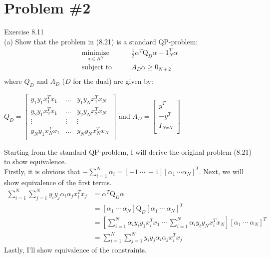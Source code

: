 \documentclass[12pt]{article}
\begin{document}
	\section*{Problem \#2}
	Exercise 8.11 \\
	(a) Show that the problem in (8.21) is a standard QP-problem:
	\begin{align*}
	\underset{\alpha \in R^{N}}{\text{minimize}} &\qquad \frac{1}{2}\alpha^T\text{Q}_D\alpha-1_{N}^{T}\alpha \\
	\text{subject to} & \qquad A_D\alpha \ge 0_{N+2} \\
	\end{align*}
	where $Q_D$ and $A_D$ ($D$ for the dual) are given by:\\
	\begin{center}
		$Q_D = \left[
		\begin{array}{ccc}
		y_1y_1x_1^Tx_1&\dots&y_1y_Nx_1^Tx_N \\
		y_2y_1x_2^Tx_1&\dots&y_2y_Nx_2^Tx_N \\
		\vdots & \vdots & \vdots \\
		y_Ny_1x_N^Tx_1&\dots&y_Ny_Nx_N^Tx_N \\
		\end{array}
		\right]$ and $A_D = \left[ 
		\begin{array}{c}
		y^T\\
		-y^T\\
		I_{N x N}\\
		\end{array} \right]$
	\end{center}
	Starting from the standard QP-problem, I will derive the original problem (8.21) to show equivalence. \\
	Firstly, it is obvious that $-\sum_{i=1}^{N}\alpha_i = [-1\ \cdots\ -1][\alpha_1 \ \cdots \alpha_N]^T$. Next, we will show equivalence of the first terms.
	\begin{align*}
		\sum_{i=1}^{N}\sum_{j=1}^{N}y_i y_j \alpha_i \alpha_j x_i^T x_j &= \alpha^T \text{Q}_D \alpha \\
		&= [\alpha_1 \ \cdots \ \alpha_N] \text{Q}_D [\alpha_1 \ \cdots \ \alpha_N]^T \\
		&= [\sum_{i=1}^{N}\alpha_iy_iy_1x_i^Tx_1 \ \cdots \ \sum_{i=1}^{N}\alpha_iy_iy_Nx_i^Tx_N] [\alpha_1 \ \cdots \ \alpha_N]^T \\
		&= \sum_{i=1}^{N}\sum_{j=1}^{N}y_i y_j \alpha_i \alpha_j x_i^T x_j
	\end{align*}
	Lastly, I'll show equivalence of the constraints.
\end{document}
